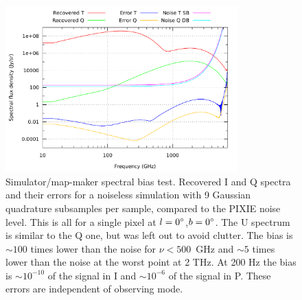 \documentclass{article}
\begin{document}
\begin{figure}
	\centering
	\includegraphics[width=0.8\textwidth]{plots/error_std_sb_abs_log_log.pdf}
	\caption{Simulator/map-maker spectral bias test. Recovered I and Q spectra and
	their errors for a noiseless simulation
	with 9 Gaussian quadrature subsamples per sample, compared to the PIXIE
	noise level. This is all for a single pixel at $l=0\degree$,$b=0\degree$.
	The U spectrum is similar to the Q one, but was left out to avoid clutter.
	The bias is $\sim 100$ times lower than the noise for $\nu<500$~GHz and
	$\sim 5$ times lower than the noise at the worst point at 2 THz. At 200
	Hz the bias is $\sim 10^{-10}$ of the signal in I and $\sim 10^{-6}$
	of the signal in P. These errors are independent of observing mode.}
	\label{fig:specbias}
\end{figure}
\end{document}
